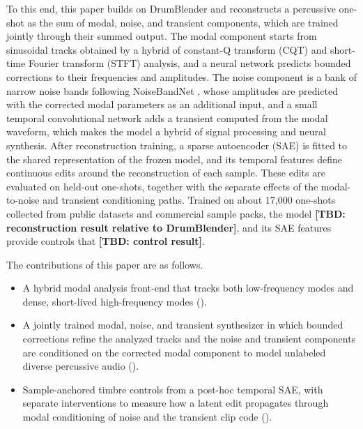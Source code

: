 To this end, this paper builds on DrumBlender \citep{shier2023differentiable} and reconstructs a percussive one-shot as the sum of modal, noise, and transient components, which are trained jointly through their summed output.
The modal component starts from sinusoidal tracks obtained by a hybrid of constant-Q transform (CQT) and short-time Fourier transform (STFT) analysis, and a neural network predicts bounded corrections to their frequencies and amplitudes.
The noise component is a bank of narrow noise bands following NoiseBandNet \citep{barahonarios2024noisebandnet}, whose amplitudes are predicted with the corrected modal parameters as an additional input, and a small temporal convolutional network adds a transient computed from the modal waveform, which makes the model a hybrid of signal processing and neural synthesis.
After reconstruction training, a sparse autoencoder (SAE) is fitted to the shared representation of the frozen model, and its temporal features define continuous edits around the reconstruction of each sample.
These edits are evaluated on held-out one-shots, together with the separate effects of the modal-to-noise and transient conditioning paths.
Trained on about 17,000 one-shots collected from public datasets and commercial sample packs, the model \textbf{[TBD: reconstruction result relative to DrumBlender]}, and its SAE features provide controls that \textbf{[TBD: control result]}.

The contributions of this paper are as follows.
\begin{itemize}
  \item A hybrid modal analysis front-end that tracks both low-frequency modes and dense, short-lived high-frequency modes ().
  \item A jointly trained modal, noise, and transient synthesizer in which bounded corrections refine the analyzed tracks and the noise and transient components are conditioned on the corrected modal component to model unlabeled diverse percussive audio ().
  \item Sample-anchored timbre controls from a post-hoc temporal SAE, with separate interventions to measure how a latent edit propagates through modal conditioning of noise and the transient clip code ().
\end{itemize}

